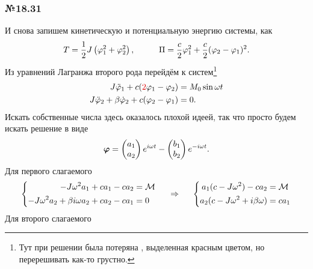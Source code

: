 \subsubsection*{№18.31}


И снова запишем кинетическую и потенциальную энергию системы, как
\begin{equation*}
    T = \frac{1}{2} J \left(\varphi_1^2 + \varphi_2^2\right),
    \hspace{1 cm}
    \Pi = \frac{c}{2} \varphi_1^2 + \frac{c}{2}(\varphi_2 - \varphi_1)^2.
\end{equation*}
Из уравнений Лагранжа второго рода перейдём к систем\footnote{
    Тут при решении была потеряна , выделенная красным цветом, но перерешивать как-то грустно.
} 
\begin{align*}
    J \ddot{\varphi}_1 + c(\text{\red{2}}\varphi_1 - \varphi_2) &= M_0 \sin \omega t\\
    J \ddot{\varphi}_2 + \beta \dot{\varphi}_2 + c (\varphi_2 - \varphi_1) &= 0.
\end{align*}
Искать собственные числа здесь оказалось плохой идеей, так что просто будем искать решение в виде
\begin{equation*}
    \mbox{\boldmath $\varphi$} = \begin{pmatrix}
        a_1 \\ a_2
    \end{pmatrix} e^{i\omega t} - 
    \begin{pmatrix}
        b_1 \\ b_2
    \end{pmatrix} e^{-i\omega t}.
\end{equation*}
Для первого слагаемого
\begin{equation*}
    \left\{\begin{aligned}
        - J \omega^2 a_1 + c a_1 - c a_2 &= \mathcal M \\
        - J \omega^2 a_2 + \beta i \omega a_2 + c a_2 - c a_1 &= 0
    \end{aligned}\right.
    \hspace{0.5cm} \Rightarrow \hspace{0.5cm}
    \left\{\begin{aligned}
        a_1 (c - J \omega^2) - c a_2 &= \mathcal M \\
        a_2 (c - J \omega^2 + i \beta \omega) &= c a_1
    \end{aligned}\right.
\end{equation*}
Для второго слагаемого
